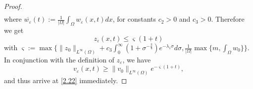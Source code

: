 \documentclass[12pt]{article}
\theoremstyle{plain}
\theoremstyle{definition}
\numberwithin{equation}{section}
\begin{document}
\begin{proof}[Proof]
\begin{align}
	\end{align}
where $\overline{w_\varepsilon}(t):=\frac{1}{|\Omega|}\int_{\Omega}w_\varepsilon(x,t)dx$, for constants $c_2>0$ and $c_3>0$.
Therefore we  get
\begin{equation*}
			z_\varepsilon(x,t)\leq \varsigma(1+t)
\end{equation*}
with $\varsigma:=\max\{\|z_{0}\|_{L^{\infty}(\Omega)} + c_3 \int_{0}^{\infty}(1+\sigma^{-\frac{3}{4}})e^{-\lambda_{1}\sigma}d\sigma,
 \frac 1{|\Omega|}\max\{m,\int_{\Omega}w_0\}\}$. In conjunction with the definition of $z_\varepsilon$, we have
 \begin{equation}\label{2.19*}
 v_\varepsilon(x,t)\geq \|v_0\|_{L^\infty(\Omega)}e^{-\varsigma(1+t)},
 \end{equation}
and thus arrive at \eqref{2.22} immediately.
	\end{proof}
\end{document}
